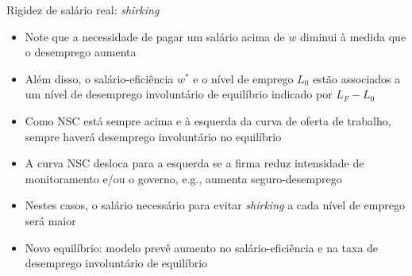 \documentclass[10pt]{beamer}
\begin{document}
\begin{frame}{Rigidez de salário real: \emph{shirking}}
    \begin{itemize}
        \item Note que a necessidade de pagar um salário acima de $w$ diminui à medida que o desemprego aumenta\bigskip
        \item Além disso, o salário-eficiência $w^*$ e o nível de emprego $L_0$ estão associados a um nível de desemprego involuntário de equilíbrio indicado por $L_F - L_0$\bigskip
        \item Como NSC está sempre acima e à esquerda da curva de oferta de trabalho, sempre haverá desemprego involuntário no equilíbrio\bigskip
        \item A curva NSC desloca para a esquerda se a firma reduz intensidade de monitoramento e/ou o governo, e.g., aumenta seguro-desemprego\bigskip
        \item Nestes casos, o salário necessário para evitar \emph{shirking} a cada nível de emprego será maior\bigskip
        \item Novo equilíbrio: modelo prevê aumento no salário-eficiência e na taxa de desemprego involuntário de equilíbrio
    \end{itemize}
\end{frame}

\end{document}
